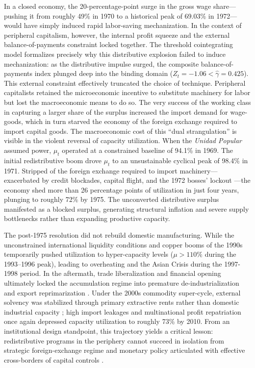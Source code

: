 In a closed economy, the 20-percentage-point surge in the gross wage share---pushing it from roughly 49\% in 1970 to a historical peak of 69.03\% in 1972---would have simply induced rapid labor-saving mechanization. In the context of peripheral capitalism, however, the internal profit squeeze and the external balance-of-payments constraint locked together. The threshold cointegrating model formalizes precisely why this distributive explosion failed to induce mechanization: as the distributive impulse surged, the composite balance-of-payments index plunged deep into the binding domain ($Z_t = -1.06 < \hat{\gamma} = 0.425$). This external constraint effectively truncated the choice of technique. Peripheral capitalists retained the microeconomic incentive to substitute machinery for labor but lost the macroeconomic means to do so. The very success of the working class in capturing a larger share of the surplus increased the import demand for wage-goods, which in turn starved the economy of the foreign exchange required to import capital goods. The macroeconomic cost of this ``dual strangulation'' is visible in the violent reversal of capacity utilization. When the \textit{Unidad Popular} assumed power, $\mu_t$ operated at a constrained baseline of 94.1\% in 1969. The initial redistributive boom drove $\mu_t$ to an unsustainable cyclical peak of 98.4\% in 1971. Stripped of the foreign exchange required to import machinery---exacerbated by credit blockades, capital flight, and the 1972 bosses' lockout \citep{DeVylder1976}---the economy shed more than 26 percentage points of utilization in just four years, plunging to roughly 72\% by 1975. The unconverted distributive surplus manifested as a blocked surplus, generating structural inflation and severe supply bottlenecks rather than expanding productive capacity. 

The post-1975 resolution did not rebuild domestic manufacturing. While the unconstrained international liquidity conditions and copper booms of the 1990s temporarily pushed utilization to hyper-capacity levels ($\mu > 110\%$ during the 1993--1996 peak), leading to overheating and the Asian Crisis during the 1997-1998 period. In the aftermath, trade liberalization and financial opening ultimately locked the accumulation regime into premature de-industrialization and export reprimarization \citep{Palma2019}. Under the 2000s commodity super-cycle, external solvency was stabilized through primary extractive rents rather than domestic industrial capacity \citep{Torres2022, Ahumada2026}; high import leakages and multinational profit repatriation once again depressed capacity utilization to roughly 73\% by 2010. From an institutional design standpoint, this trajectory yields a critical lesson: redistributive programs in the periphery cannot succeed in isolation from strategic foreign-exchange regime and monetary policy articulated with effective cross-borders of capital controls \citep{Ffrench2018}. 

